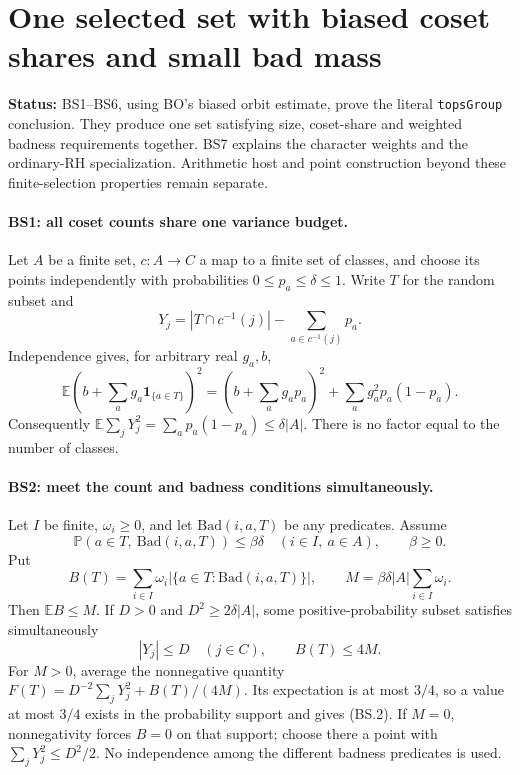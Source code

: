 \documentclass[11pt,a4paper]{article}
\numberwithin{equation}{section}
\theoremstyle{remark}\newtheorem{remark}[theorem]{Remark}
\newcommand{\status}[1]{\textbf{Status:} #1}
\begin{document}
\section{One selected set with biased coset shares and small bad mass}
\label{sec:balanced-tops}

\status{BS1--BS6, using BO's biased orbit estimate, prove the literal
\texttt{topsGroup} conclusion. They produce one set satisfying size,
coset-share and weighted badness requirements together. BS7 explains
the character weights and the ordinary-RH specialization. Arithmetic
host and point construction beyond these finite-selection properties
remain separate.}

\paragraph{BS1: all coset counts share one variance budget.}
Let $A$ be a finite set, $c:A\to C$ a map to a finite set of classes,
and choose its points independently with probabilities
$0\le p_a\le\delta\le1$. Write $T$ for the random subset and
\[
 Y_j=|T\cap c^{-1}(j)|-\sum_{a\in c^{-1}(j)}p_a.
\]
Independence gives, for arbitrary real $g_a,b$,
\[
 \mathbb E\left(b+\sum_a g_a\mathbf1_{\{a\in T\}}\right)^2
 =\left(b+\sum_a g_ap_a\right)^2+
       \sum_a g_a^2p_a(1-p_a).
                                                        \tag{BS.1}
\]
Consequently
$\mathbb E\sum_jY_j^2=\sum_ap_a(1-p_a)\le\delta|A|$.
There is no factor equal to the number of classes.

\paragraph{BS2: meet the count and badness conditions simultaneously.}
Let $I$ be finite, $\omega_i\ge0$, and let
$\mathrm{Bad}(i,a,T)$ be any predicates. Assume
\[
 \mathbb P(a\in T,\ \mathrm{Bad}(i,a,T))\le\beta\delta
 \quad(i\in I,\ a\in A),\qquad \beta\ge0.
\]
Put
\[
 B(T)=\sum_{i\in I}\omega_i
         |\{a\in T:\mathrm{Bad}(i,a,T)\}|,\qquad
 M=\beta\delta|A|\sum_{i\in I}\omega_i.
\]
Then $\mathbb EB\le M$. If $D>0$ and $D^2\ge2\delta|A|$,
some positive-probability subset satisfies simultaneously
\[
 |Y_j|\le D\quad(j\in C),\qquad B(T)\le4M.             \tag{BS.2}
\]
For $M>0$, average the nonnegative quantity
$F(T)=D^{-2}\sum_jY_j^2+B(T)/(4M)$.
Its expectation is at most $3/4$, so a value at most $3/4$
exists in the probability support and gives (BS.2).
If $M=0$, nonnegativity forces $B=0$ on that support; choose
there a point with $\sum_jY_j^2\le D^2/2$.
No independence among the different badness predicates is used.
\end{document}
